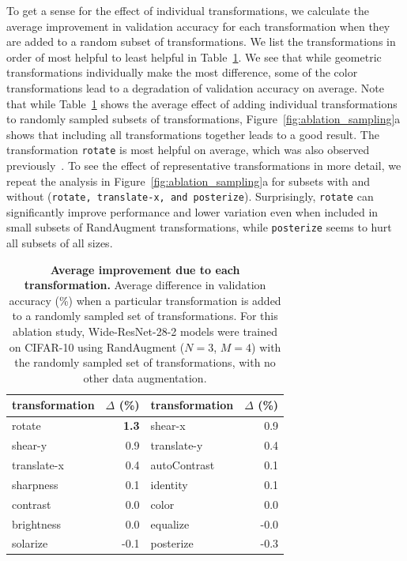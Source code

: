 To get a sense for the effect of individual transformations, we calculate the average improvement in validation accuracy for each transformation when they are added to a random subset of transformations. We list the transformations in order of most helpful to least helpful in Table~\ref{tab:ablation_transform_list}. We see that while geometric transformations individually make the most difference, some of the color transformations lead to a degradation of validation accuracy on average. Note that while Table~\ref{tab:ablation_transform_list} shows the average effect of adding individual transformations to randomly sampled subsets of transformations, Figure~\ref{fig:ablation_sampling}a shows that including all transformations together leads to a good result. The transformation {\footnotesize\texttt{rotate}} is most helpful on average, which was also observed previously~\cite{cubuk2018autoaugment, zoph2019learning}. To see the effect of representative transformations in more detail, we repeat the analysis in Figure~\ref{fig:ablation_sampling}a for subsets with and without ({\footnotesize\texttt{rotate, translate-x, and posterize}}). Surprisingly, {\footnotesize\texttt{rotate}} can significantly improve performance and lower variation even when included in small subsets of RandAugment transformations, while {\footnotesize\texttt{posterize}} seems to hurt all subsets of all sizes.    

\begin{table}[t]
\centering
\small
\begin{tabular}{lr|lr}
 \hline
transformation & $\Delta$ (\%) &transformation & $\Delta$ (\%)\\
\hline
rotate&\textbf{1.3}&shear-x&0.9\\
shear-y&0.9&translate-y&0.4\\
translate-x&0.4&autoContrast&0.1\\
sharpness&0.1&identity&0.1\\
contrast&0.0&color&0.0\\
brightness&0.0&equalize&-0.0\\
solarize&-0.1&posterize&-0.3\\
\end{tabular}
\vspace{0.2cm}
\caption{{\bf Average improvement due to each transformation.} Average difference in validation accuracy (\%) when a particular transformation is added to a randomly sampled set of transformations. For this ablation study, Wide-ResNet-28-2 models were trained on CIFAR-10 using RandAugment ($N=3$, $M=4$) with the randomly sampled set of transformations, with no other data augmentation.}
\label{tab:ablation_transform_list}
\end{table}



